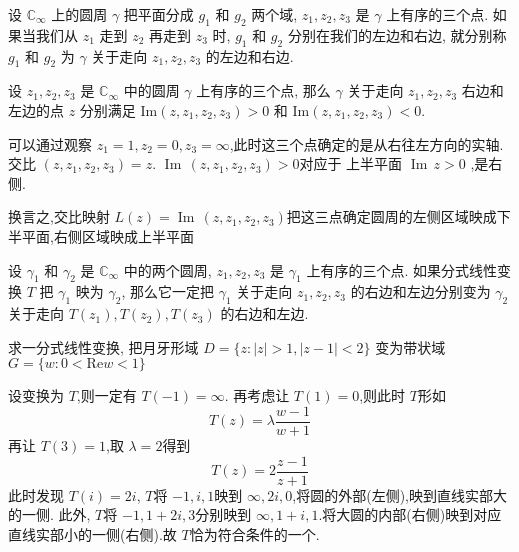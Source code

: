 \documentclass[../../复变函数.tex]{subfiles}
\begin{document}
\begin{definition}
    设 $\mathbb{C}_\infty$ 上的圆周 $\gamma$ 把平面分成 $g_1$ 和 $g_2$ 两个域, $z_1, z_2, z_3$ 是 $\gamma$ 上有序的三个点. 如果当我们从 $z_1$ 走到 $z_2$ 再走到 $z_3$ 时, $g_1$ 和 $g_2$ 分别在我们的左边和右边, 就分别称 $g_1$ 和 $g_2$ 为 $\gamma$ 关于走向 $z_1, z_2, z_3$ 的左边和右边.
\end{definition}
\begin{proposition}
    设 $z_1, z_2, z_3$ 是 $\mathbb{C}_\infty$ 中的圆周 $\gamma$ 上有序的三个点, 那么 $\gamma$ 关于走向 $z_1, z_2, z_3$ 右边和左边的点 $z$ 分别满足
$\text{Im}(z, z_1, z_2, z_3) > 0$
和
$\text{Im}(z, z_1, z_2, z_3) < 0.$
\end{proposition}
\begin{remark}
    可以通过观察 \(  z_1= 1, z_2= 0,z_3= \infty  \),此时这三个点确定的是从右往左方向的实轴.交比 \(  \left( z,z_1,z_2,z_3 \right)= z   \).  \(  \operatorname{Im}\,\left( z,z_1,z_2,z_3 \right)   > 0\)对应于 上半平面  \(  \operatorname{Im}\,z> 0  \) ,是右侧.
\end{remark}
\begin{remark}
    换言之,交比映射 \(  L\left( z \right)= \operatorname{Im}\,\left( z,z_1,z_2,z_3 \right)    \)把这三点确定圆周的左侧区域映成下半平面,右侧区域映成上半平面 
\end{remark}
\begin{theorem}
    设 $\gamma_1$ 和 $\gamma_2$ 是 $\mathbb{C}_\infty$ 中的两个圆周, $z_1, z_2, z_3$ 是 $\gamma_1$ 上有序的三个点. 如果分式线性变换 $T$ 把 $\gamma_1$ 映为 $\gamma_2$, 那么它一定把 $\gamma_1$ 关于走向 $z_1, z_2, z_3$ 的右边和左边分别变为 $\gamma_2$ 关于走向 $T(z_1), T(z_2), T(z_3)$ 的右边和左边.
\end{theorem}
\begin{example}[ 月牙区域变带状]
    求一分式线性变换, 把月牙形域 $D = \{z : |z| > 1, |z - 1| < 2\}$ 变为带状域 $G = \{w : 0 < \text{Re} w < 1\}$
\end{example}
\begin{solution}
    设变换为 \(  T  \),则一定有 \(  T\left( -1 \right)= \infty   \). 再考虑让 \(  T\left( 1 \right)= 0   \),则此时 \(  T  \)形如 \[
    T\left( z \right)=  \lambda \frac{w-1 }{w+ 1 }  
    \]再让 \(  T\left( 3 \right)= 1   \),取 \(   \lambda = 2  \)得到 \[
    T\left( z \right)= 2\frac{z-1 }{z+ 1 }  
    \]此时发现 \(  T\left( i \right)= 2i   \), \(  T  \)将 \(  -1,i,1  \)映到 \(  \infty, 2i,0 \),将圆的外部(左侧),映到直线实部大的一侧. 此外, \(  T  \)将 \(  -1,1+ 2i,3  \)分别映到 \(  \infty,1+ i,1  \).将大圆的内部(右侧)映到对应直线实部小的一侧(右侧).故 \(  T  \)恰为符合条件的一个.              
\end{solution}
\end{document}
